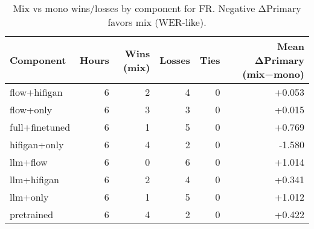 \begin{table}[htbp!]
\centering
\small
\begin{tabular}{lrrrrr}
\toprule
Component & Hours & Wins (mix) & Losses & Ties & Mean ΔPrimary (mix−mono) \\
\midrule
flow+hifigan & 6 & 2 & 4 & 0 & +0.053 \\
flow+only & 6 & 3 & 3 & 0 & +0.015 \\
full+finetuned & 6 & 1 & 5 & 0 & +0.769 \\
hifigan+only & 6 & 4 & 2 & 0 & -1.580 \\
llm+flow & 6 & 0 & 6 & 0 & +1.014 \\
llm+hifigan & 6 & 2 & 4 & 0 & +0.341 \\
llm+only & 6 & 1 & 5 & 0 & +1.012 \\
pretrained & 6 & 4 & 2 & 0 & +0.422 \\
\bottomrule
\end{tabular}
\caption{Mix vs mono wins/losses by component for FR. Negative ΔPrimary favors mix (WER-like).}
\label{tab:mix-vs-mono-winloss-fr}
\end{table}
